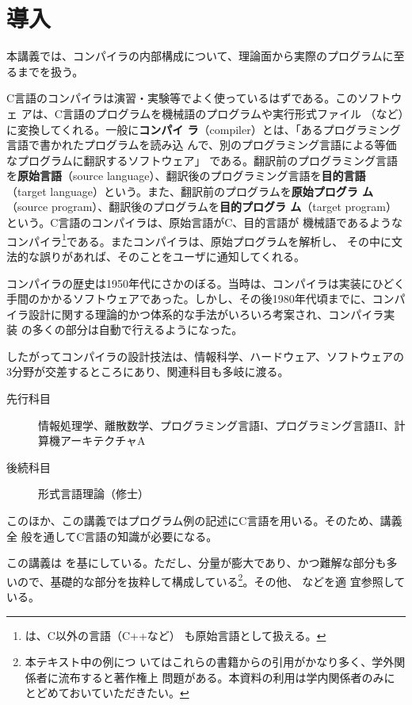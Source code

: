 
\chapter{導入}
\label{134138_29Mar06}

本講義では、コンパイラの内部構成について、理論面から実際のプログラムに至
るまでを扱う。

C言語のコンパイラは演習・実験等でよく使っているはずである。このソフトウェ
アは、C言語のプログラムを機械語のプログラムや実行形式ファイル
（など）に変換してくれる。一般に{\bfseries コンパイ
ラ}（compiler）とは、「あるプログラミング言語で書かれたプログラムを読み込
んで、別のプログラミング言語による等価なプログラムに翻訳するソフトウェア」
である。翻訳前のプログラミング言語を{\bfseries 原始言語}（source
language）、翻訳後のプログラミング言語を{\bfseries 目的言語}（target
language）という。また、翻訳前のプログラムを{\bfseries 原始プログラ
ム}（source program）、翻訳後のプログラムを{\bfseries 目的プログラ
ム}（target program）という。C言語のコンパイラは、原始言語がC、目的言語が
機械語であるようなコンパイラ\footnote{は、C以外の言語（C++など）
も原始言語として扱える。}である。またコンパイラは、原始プログラムを解析し、
その中に文法的な誤りがあれば、そのことをユーザに通知してくれる。

コンパイラの歴史は1950年代にさかのぼる。当時は、コンパイラは実装にひどく
手間のかかるソフトウェアであった。しかし、その後1980年代頃までに、コンパ
イラ設計に関する理論的かつ体系的な手法がいろいろ考案され、コンパイラ実装
の多くの部分は自動で行えるようになった。

したがってコンパイラの設計技法は、情報科学、ハードウェア、ソフトウェアの
3分野が交差するところにあり、関連科目も多岐に渡る。
\begin{description}
 \item[先行科目] 情報処理学、離散数学、プログラミング言語I、プログラミング言語II、計算機アーキテクチャA
 \item[後続科目] 形式言語理論（修士）
\end{description}
このほか、この講義ではプログラム例の記述にC言語を用いる。そのため、講義全
般を通してC言語の知識が必要になる。

この講義は
\cite{aho86:_compiler}\cite{aho07:_compil_princ_techn_tools_secon_edition}
\cite{湯浅01}を基にしている。ただし、分量が膨大であり、かつ難解な部分も多
いので、基礎的な部分を抜粋して構成している\footnote{本テキスト中の例につ
いてはこれらの書籍からの引用がかなり多く、学外関係者に流布すると著作権上
問題がある。本資料の利用は学内関係者のみにとどめておいていただきたい。}。その他、
\cite{ホップクロフト03:automaton}\cite{中田99}\cite{カーニハン89}などを適
宜参照している。

